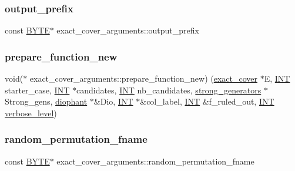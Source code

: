 \subsubsection{\texorpdfstring{output\+\_\+prefix}{output\_prefix}}
{\footnotesize\ttfamily const \mbox{\hyperlink{galois_8h_ab6cc7b4aeb6ea31aba2b3fbfc83ff5e6}{B\+Y\+TE}}$\ast$ exact\+\_\+cover\+\_\+arguments\+::output\+\_\+prefix}

\mbox{\label{classexact__cover__arguments_a30036df66f5fb27c41d2507689157587}} 
\subsubsection{\texorpdfstring{prepare\+\_\+function\+\_\+new}{prepare\_function\_new}}
{\footnotesize\ttfamily void($\ast$ exact\+\_\+cover\+\_\+arguments\+::prepare\+\_\+function\+\_\+new) (\mbox{\hyperlink{classexact__cover}{exact\+\_\+cover}} $\ast$E, \mbox{\hyperlink{galois_8h_a09fddde158a3a20bd2dcadb609de11dc}{I\+NT}} starter\+\_\+case, \mbox{\hyperlink{galois_8h_a09fddde158a3a20bd2dcadb609de11dc}{I\+NT}} $\ast$candidates, \mbox{\hyperlink{galois_8h_a09fddde158a3a20bd2dcadb609de11dc}{I\+NT}} nb\+\_\+candidates, \mbox{\hyperlink{classstrong__generators}{strong\+\_\+generators}} $\ast$Strong\+\_\+gens, \mbox{\hyperlink{classdiophant}{diophant}} $\ast$\&Dio, \mbox{\hyperlink{galois_8h_a09fddde158a3a20bd2dcadb609de11dc}{I\+NT}} $\ast$\&col\+\_\+label, \mbox{\hyperlink{galois_8h_a09fddde158a3a20bd2dcadb609de11dc}{I\+NT}} \&f\+\_\+ruled\+\_\+out, \mbox{\hyperlink{galois_8h_a09fddde158a3a20bd2dcadb609de11dc}{I\+NT}} \mbox{\hyperlink{simeon_8_c_a818073fbcc2f439e7c56952f67386122}{verbose\+\_\+level}})}

\mbox{\label{classexact__cover__arguments_a751900e58598a7d8f1793aa361309884}} 
\subsubsection{\texorpdfstring{random\+\_\+permutation\+\_\+fname}{random\_permutation\_fname}}
{\footnotesize\ttfamily const \mbox{\hyperlink{galois_8h_ab6cc7b4aeb6ea31aba2b3fbfc83ff5e6}{B\+Y\+TE}}$\ast$ exact\+\_\+cover\+\_\+arguments\+::random\+\_\+permutation\+\_\+fname}

